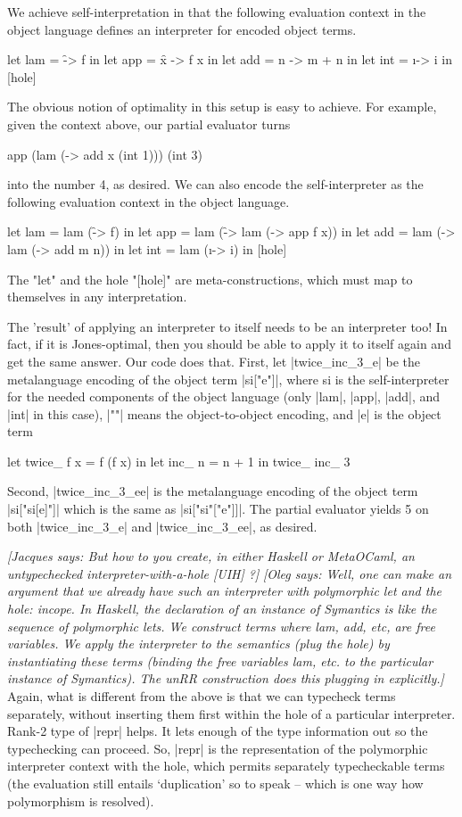\documentclass[preprint]{sigplanconf}
\newcommand{\jacques}[1]{{\it [Jacques says: #1]}}
\newcommand{\oleg}[1]{{\it [Oleg says: #1]}}
\begin{document}
We achieve
self-interpretation in that the following evaluation context in the
object language defines an interpreter for encoded object terms.
\begin{code}
  let lam = \f -> f in
  let app = \f x -> f x in
  let add = \m n -> m + n in
  let int = \i -> i in
  [hole]
\end{code}
The obvious notion of optimality in this setup is easy to achieve.  For
example, given the context above, our partial evaluator turns
\begin{code}
  app (lam (\x -> add x (int 1))) (int 3)
\end{code}
into the number 4, as desired.  We can also encode the self-interpreter
as the following evaluation context in the object language.
\begin{code}
  let lam = lam (\f -> f) in
  let app = lam (\f -> lam (\x -> app f x)) in
  let add = lam (\m -> lam (\n -> add m n)) in
  let int = lam (\i -> i) in
  [hole]
\end{code}
The "let" and the hole "[hole]" are meta-constructions, which must map to
themselves in any interpretation.  

The 'result' of applying an interpreter to itself needs to be an 
interpreter too!  In fact, if it is Jones-optimal, then you should be 
able to apply it to itself again and get the same answer.  
Our code does that. First, let |twice_inc_3_e| be the
metalanguage encoding of the object term |si["e"]|,
where si is the self-interpreter for the needed components of the object
language (only |lam|, |app|, |add|, and |int| in this case), |""| means the
object-to-object encoding, and |e| is the object term
\begin{code}
  let twice_ f x = f (f x) in let inc_ n = n + 1 in twice_ inc_ 3
\end{code}
Second, |twice_inc_3_ee| is the metalanguage encoding of the object term
|si["si[e]"]|
which is the same as
|si["si"["e"]]|.
The partial evaluator yields 5 on both |twice_inc_3_e| and 
|twice_inc_3_ee|,
as desired.

\jacques{But how 
to you create, in either Haskell or MetaOCaml, an untypechecked 
interpreter-with-a-hole [UIH] ?}
\oleg{Well, one can make an argument that we already have such an
interpreter with polymorphic let and the hole: incope. In Haskell, the
declaration of an instance of Symantics is like the sequence of
polymorphic lets. We construct terms where lam, add, etc, are free
variables. We apply the interpreter to the semantics (plug the hole)
by instantiating these terms (binding the free variables lam, etc. to
the particular instance of Symantics). The unRR construction does
this plugging in explicitly.}
Again, what is different from the above is that we can
typecheck terms separately, without inserting them first within the
hole of a particular interpreter. Rank-2 type of |repr| helps. It lets
enough of the type information out so the typechecking can
proceed. So, |repr| is the representation of the polymorphic
interpreter context with the hole, which permits separately
typecheckable terms (the evaluation still entails `duplication' so to
speak -- which is one way how polymorphism is resolved).
\end{document}
